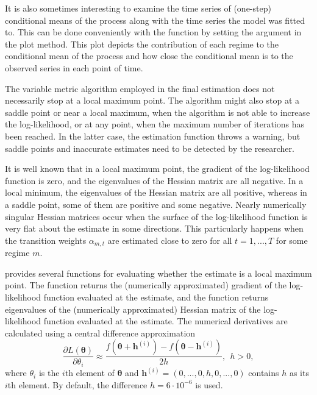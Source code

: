 \documentclass[nojss]{jss}
\begin{document}
It is also sometimes interesting to examine the time series of (one-step) conditional means of the process along with the time series the model was fitted to. This can be done conveniently with the function by setting the argument  in the plot method. This plot depicts the contribution of each regime to the conditional mean of the process and how close the conditional mean is to the observed series in each point of time.

The variable metric algorithm employed in the final estimation does not necessarily stop at a local maximum point. The algorithm might also stop at a saddle point or near a local maximum, when the algorithm is not able to increase the log-likelihood, or at any point, when the maximum number of iterations has been reached. In the latter case, the estimation function throws a warning, but saddle points and inaccurate estimates need to be detected by the researcher.

It is well known that in a local maximum point, the gradient of the log-likelihood function is zero, and the eigenvalues of the Hessian matrix are all negative. In a local minimum, the eigenvalues of the Hessian matrix are all positive, whereas in a saddle point, some of them are positive and some negative. Nearly numerically singular Hessian matrices occur when the surface of the log-likelihood function is very flat about the estimate in some directions. This particularly happens when the transition weights $\alpha_{m,t}$ are estimated close to zero for all $t=1,...,T$ for some regime $m$.

 provides several functions for evaluating whether the estimate is a local maximum point. The function  returns the (numerically approximated) gradient of the log-likelihood function evaluated at the estimate, and the function  returns eigenvalues of the (numerically approximated) Hessian matrix of the log-likelihood function evaluated at the estimate. The numerical derivatives are calculated using a central difference approximation
\begin{equation}
\frac{\partial L(\boldsymbol{\theta})}{\partial \theta_i} \approx \frac{f(\boldsymbol{\theta} + \boldsymbol{h}^{(i)}) - f(\boldsymbol{\theta} - \boldsymbol{h}^{(i)})}{2h}, \ \ h>0,
\end{equation}
where $\theta_i$ is the $i$th element of $\boldsymbol{\theta}$ and $\boldsymbol{h}^{(i)}=(0,...,0,h,0,...,0)$
contains $h$ as its $i$th element. By default, the difference $h=6\cdot 10^{-6}$ is used.
\end{document}
